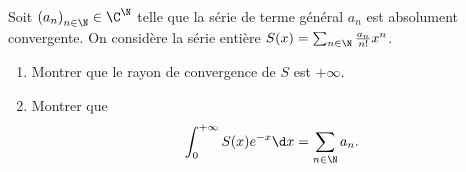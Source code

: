 \begin{enonce}
\begin{exercise}[ID={RMS126 E785},subtitle={Centrale PSI 2015},tags={}, difficulty={0}]
Soit $\left( a_n \right)_{n\in\N}\in{\C}^{\N}$ telle que la série de terme général $a_n$ est absolument convergente.
On considère la série entière $S(x)=\sum_{n\in\N} \frac{a_n}{n!} x^n$.
\begin{enumerate}
  \item Montrer que le rayon de convergence de $S$ est $+\infty$.
  \item Montrer que
    \begin{equation*}
      \int_0^{+\infty} S(x) e^{-x}\d x = \sum_{n\in\N} a_n.
    \end{equation*}
\end{enumerate}
\end{exercise}
\begin{solution}
\end{solution}
\end{enonce}
